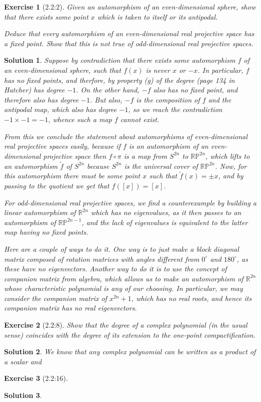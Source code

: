 \documentclass{article}
\theoremstyle{plain}
\newtheorem*{ex}{Exercise}
\theoremstyle{nonumberplain}
\newtheorem{sol}{Solution}
\newcommand{\R}{\mathbb{R}}
\newcommand{\PP}{\mathbb{P}}
\begin{document}
\begin{ex}[2.2:2]
Given an automorphism of an even-dimensional sphere, show that there exists some point $x$ which is taken to itself or its antipodal.

Deduce that every automorphism of an even-dimensional real projective space has a fixed point. Show that this is not true of odd-dimensional real projective spaces.
\end{ex}

\begin{sol}
Suppose by contradiction that there exists some automorphism $f$ of an even-dimensional sphere, such that $f(x)$ is never $x$ or $-x$. In particular, $f$ has no fixed points, and therfore, by property (g) of the degree (page 134 in Hatcher) has degree $-1$. On the other hand, $-f$ also has no fixed point, and therefore also has degree $-1$. But also, $-f$ is the composition of $f$ and the antipodal map, which also has degree $-1$, so we reach the contradiction $-1 \times -1 = -1$, whence such a map $f$ cannot exist.

From this we conclude the statement about automorphisms of even-dimensional real projective spaces easily, because if $f$ is an automorphism of an even-dimensional projective space then $f \circ \pi$ is a map from $S^{2n}$ to $\R \PP^{2n}$, which lifts to an automorphism $\tilde f$ of $S^{2n}$ because $S^{2n}$ is the universal cover of $\R \PP^{2n}$. Now, for this automorphism there must be some point $x$ such that $\tilde f(x) = \pm x$, and by passing to the quotient we get that $f([x]) = [x]$.

For odd-dimensional real projective spaces, we find a counterexample by building a linear automorphism of $\R^{2n}$ which has no eigenvalues, as it then passes to an automorphism of $\R \PP^{2n-1}$, and the lack of eigenvalues is equivalent to the latter map having no fixed points.

Here are a couple of ways to do it. One way is to just make a block diagonal matrix composed of rotation matrices with angles different from $0^\circ$ and $180^\circ$, as these have no eigenvectors. Another way to do it is to use the concept of companion matrix from algebra, which allows us to make an automorphism of $\R^{2n}$ whose characteristic polynomial is any of our choosing. In particular, we may consider the companion matrix of $x^{2n} + 1$, which has no real roots, and hence its companion matrix has no real eigenvectors.
\end{sol}

\begin{ex}[2.2:8]
Show that the degree of a complex polynomial (in the usual sense) coincides with the degree of its extension to the one-point compactification.
\end{ex}

\begin{sol}
We know that any complex polynomial can be written as a product of a scalar and
\end{sol}

\begin{ex}[2.2:16]
\end{ex}

\begin{sol}
\end{sol}
\end{document}

